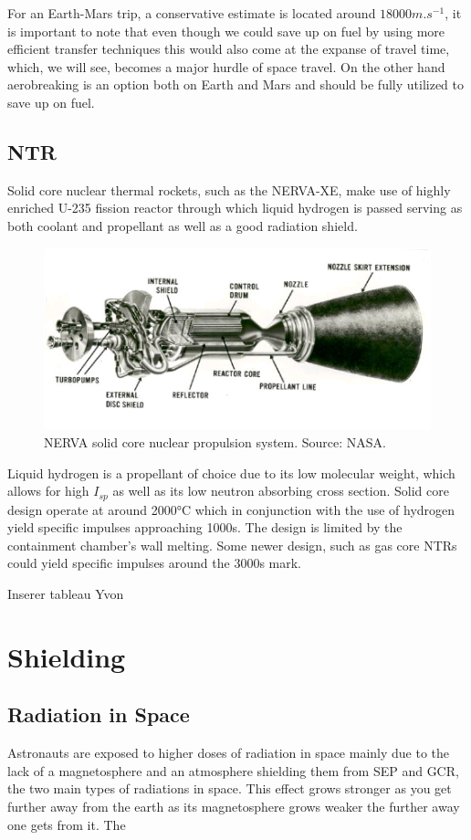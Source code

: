 \documentclass[12pt,a4paper]{report}
\begin{document}
For an Earth-Mars trip, a conservative estimate is located around $18000m.s^{-1}$, it is important to note that even though we could save up on fuel by using more efficient transfer techniques this would also come at the expanse of travel time, which, we will see, becomes a major hurdle of space travel. On the other hand aerobreaking is an option both on Earth and Mars and should be fully utilized to save up on fuel.
\newpage
\subsection{NTR}
Solid core nuclear thermal rockets, such as the NERVA-XE, make use of highly enriched U-235 fission reactor through which liquid hydrogen is passed serving as both coolant and propellant\cite{Finseth1991} as well as a good radiation shield.
\begin{figure}[hbtp]
\centering
\includegraphics[scale=.7]{img/NERVA-solid-core-nuclear-propulsion-system.png}
\caption{NERVA solid core nuclear propulsion system. Source:
NASA.}
\end{figure}
Liquid hydrogen is a propellant of choice due to its low molecular weight, which allows for high $I_{sp}$ as well as its low neutron absorbing cross section. Solid core design operate at around 2000°C which in conjunction with the use of hydrogen yield specific impulses approaching 1000s. The design is limited by the containment chamber's wall melting. Some newer design, such as gas core NTRs could yield specific impulses around the 3000s mark.
\begin{Huge}
Inserer tableau Yvon
\end{Huge}


\newpage
\section{Shielding}
\subsection{Radiation in Space}
Astronauts are exposed to higher doses of radiation in space mainly due to the lack of a magnetosphere and an atmosphere shielding them from SEP and GCR, the two main types of radiations in space. This effect grows stronger as you get further away from the earth as its magnetosphere grows weaker the further away one gets from it.
The 
\end{document}

